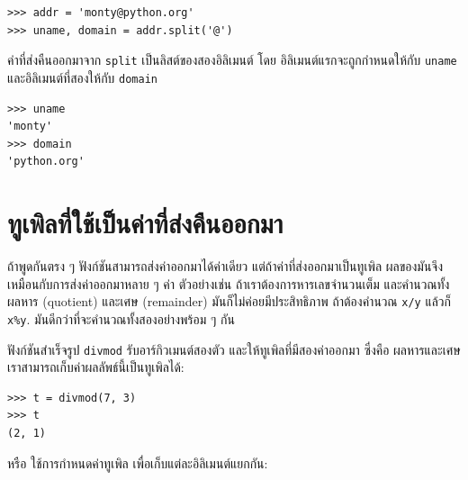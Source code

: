\begin{verbatim}
>>> addr = 'monty@python.org'
>>> uname, domain = addr.split('@')
\end{verbatim}
%
%
ค่าที่ส่งคืนออกมาจาก \texttt{split} เป็นลิสต์ของสองอิลิเมนต์
โดย
อิลิเมนต์แรกจะถูกกำหนดให้กับ \texttt{uname}
และอิลิเมนต์ที่สองให้กับ \texttt{domain}

\begin{verbatim}
>>> uname
'monty'
>>> domain
'python.org'
\end{verbatim}
%

\section{ทูเพิลที่ใช้เป็นค่าที่ส่งคืนออกมา}



ถ้าพูดกันตรง ๆ ฟังก์ชันสามารถส่งค่าออกมาได้ค่าเดียว
แต่ถ้าค่าที่ส่งออกมาเป็นทูเพิล
ผลของมันจึงเหมือนกับการส่งค่าออกมาหลาย ๆ ค่า
ตัวอย่างเช่น ถ้าเราต้องการหารเลขจำนวนเต็ม 
และคำนวณทั้ง ผลหาร (quotient) และเศษ (remainder)
มันก็ไม่ค่อยมีประสิทธิภาพ
ถ้าต้องคำนวณ \texttt{x/y} แล้วก็ \texttt{x\%y}.
มันดีกว่าที่จะคำนวณทั้งสองอย่างพร้อม ๆ กัน


ฟังก์ชันสำเร็จรูป \texttt{divmod} รับอาร์กิวเมนต์สองตัว
และให้ทูเพิลที่มีสองค่าออกมา
ซึ่งคือ ผลหารและเศษ
เราสามารถเก็บค่าผลลัพธ์นี้เป็นทูเพิลได้:

\begin{verbatim}
>>> t = divmod(7, 3)
>>> t
(2, 1)
\end{verbatim}
%
%
หรือ ใช้การกำหนดค่าทูเพิล เพื่อเก็บแต่ละอิลิเมนต์แยกกัน:

